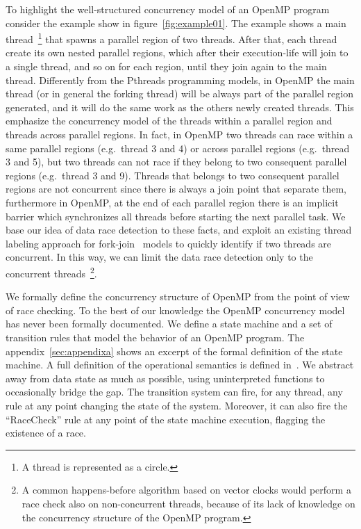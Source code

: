 To highlight the well-structured concurrency model of an OpenMP program
consider the example show in figure~\ref{fig:example01}.
%
The example shows a main thread~\footnote{A thread is represented as a
  circle.} that spawns a parallel region of two threads.
%
After that, each thread create its own nested parallel regions, which after
their execution-life will join to a single thread, and so on for each region,
until they join again to the main thread.
%
Differently from the Pthreads programming models, in OpenMP the main thread
(or in general the forking thread) will be always part of the parallel region
generated, and it will do the same work as the others newly created threads.
%
This emphasize the concurrency model of the threads within a parallel region
and threads across parallel regions.
%
In fact, in OpenMP two threads can race within a same parallel regions (e.g.\
thread 3 and 4) or across parallel regions (e.g.\ thread 3 and 5), but two
threads can not race if they belong to two consequent parallel regions (e.g.\
thread 3 and 9).
%
Threads that belongs to two consequent parallel regions are not concurrent
since there is always a join point that separate them, furthermore in OpenMP,
at the end of each parallel region there is an implicit barrier which
synchronizes all threads before starting the next parallel task.
%
We base our idea of data race detection to these facts, and exploit an
existing thread labeling approach for
fork-join~\cite{Mellor-Crummey:1991:ODD:125826.125861} models to quickly
identify if two threads are concurrent.
%
In this way, we can limit the data race detection only to the concurrent
threads~\footnote{A common happens-before algorithm based on vector clocks
  would perform a race check also on non-concurrent threads, because of its
  lack of knowledge on the concurrency structure of the OpenMP program.}.

We formally define the concurrency structure of OpenMP from the point of view
of race checking.
%
To the best of our knowledge the OpenMP concurrency model has never been
formally documented.
%
We define a state machine and a set of transition rules that model the
behavior of an OpenMP program.                            
%
The appendix~\ref{sec:appendixa} shows an excerpt of the formal definition of
the state machine.
%
A full definition of the operational semantics is defined
in~\cite{atzeni_opsem16}.
%
We abstract away from data state as much as possible, using uninterpreted
functions to occasionally bridge the gap.
%
The transition system can fire, for any thread, any rule at any point changing
the state of the system.
%
Moreover, it can also fire the ``RaceCheck'' rule at any point of the state
machine execution, flagging the existence of a race.

